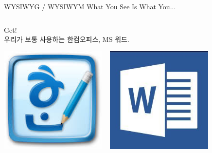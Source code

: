 \documentclass[12pt]{beamer}
\begin{document}
\begin{frame}{WYSIWYG / WYSIWYM}
	What You See Is What You...
	\vfill
	\begin{columns}
		\begin{column}{0.5\textwidth}
			Get! \\
			\vfill
			우리가 보통 사용하는 한컴오피스, MS 워드. \\
			\begin{center}
				\includegraphics[width=0.4\textwidth]{hanwordicon.jpg}
				~
				\includegraphics[width=0.4\textwidth]{mswordicon.jpg}
			\end{center}
			

\end{column}
\end{columns}
\end{frame}
\end{document}
